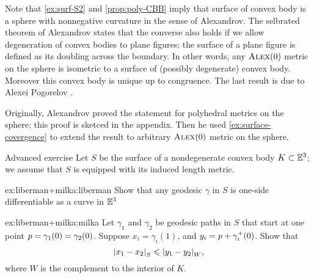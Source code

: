 Note that \ref{ex:surf-S2} and \ref{prop:poly-CBB} imply that surface of convex body is a sphere with nonnegative curvature in the sense of Alexandrov.
The selbrated theorem of Alexandrov states that the converse also holds if we allow degeneration of convex bodies to plane figures;
the surface of a plane figure is defined as its doubling across the boundary.
In other words, any $\textsc{Alex}(0)$ metric on the sphere is isometric to a surface of (possibly degenerate) convex body.
Moreover this convex body is unique up to congruence.
The last result is due to Alexei Pogorelov \cite{pogorelov}.

Originally, Alexandrov proved the statement for polyhedral metrics on the sphere; this proof is sketced in the appendix.
Then he used \ref{ex:surface-covergence} to extend the result to arbitrary $\textsc{Alex}(0)$ metric on the sphere.

\begin{thm}{Advanced exercise}\label{ex:liberman+milka}
Let $S$ be the surface of a nondegenerate convex body $K\subset\mathbb{E}^3$;
we assume that $S$ is equipped with its induced length metric.

\begin{subthm}{ex:liberman+milka:liberman}
Show that any geodesic $\gamma$ in $S$ is one-side differentiable as a curve in $\mathbb{E}^3$ 
\end{subthm}

\begin{subthm}{ex:liberman+milka:milka}
Let $\gamma_1$ and $\gamma_2$ be geodesic paths in $S$ that start at one point $p\z=\gamma_1(0)\z=\gamma_2(0)$.
Suppose $x_i=\gamma_i(1)$, and $y_i\z=p+\gamma_i^+(0)$.
Show that 
\[\dist{x_1}{x_2}{S}\le \dist{y_1}{y_2}{W},\]
where $W$ is the complement to the interior of $K$.
\end{subthm}

\end{thm}

